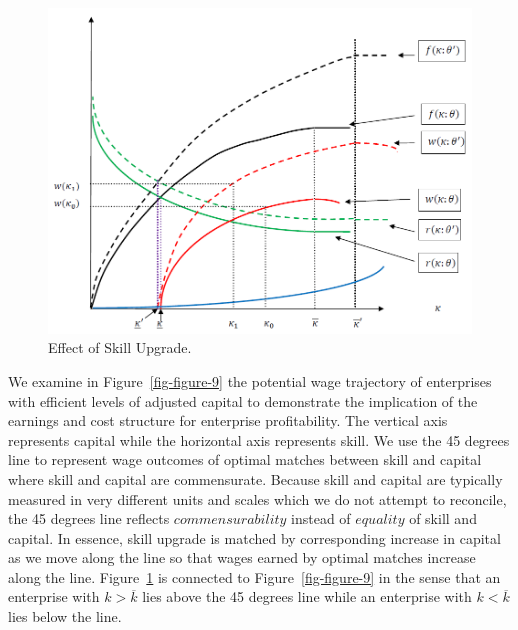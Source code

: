 \documentclass[
  a4paper,
  DIV=11,
  numbers=noendperiod]{scrartcl}
\begin{document}
\begin{figure}

{\centering \includegraphics{figures/figure-8.png}

}

\caption{\label{fig-figure-8}Effect of Skill Upgrade.}

\end{figure}

We examine in Figure~\ref{fig-figure-9} the potential wage trajectory of
enterprises with efficient levels of adjusted capital to demonstrate the
implication of the earnings and cost structure for enterprise
profitability. The vertical axis represents capital while the horizontal
axis represents skill. We use the 45 degrees line to represent wage
outcomes of optimal matches between skill and capital where skill and
capital are commensurate. Because skill and capital are typically
measured in very different units and scales which we do not attempt to
reconcile, the 45 degrees line reflects \(commensurability\) instead of
\(equality\) of skill and capital. In essence, skill upgrade is matched
by corresponding increase in capital as we move along the line so that
wages earned by optimal matches increase along the line.
Figure~\ref{fig-figure-8} is connected to Figure~\ref{fig-figure-9} in
the sense that an enterprise with \(k>\overline{k}\) lies above the 45
degrees line while an enterprise with \(k<\overline{k}\) lies below the
line.
\end{document}
